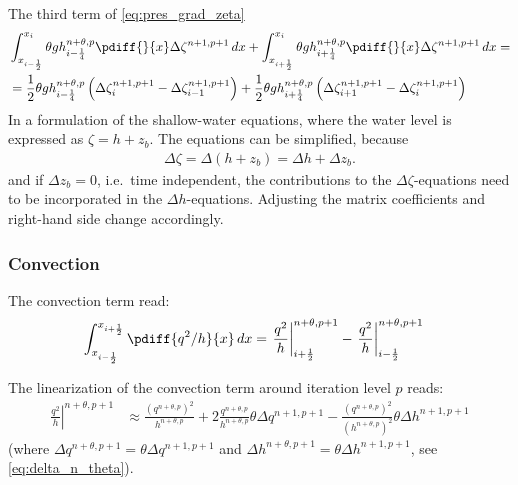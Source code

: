 The third term of \autoref{eq:pres_grad_zeta}
\begin{align}
    &\int_{x_{i-\half}}^{x_{i}} \theta g h^{n+\theta,p}_{i-\quart} \pdiff{}{x} \Delta \zeta^{n+1, p+1} \,dx + \int_{x_{i+\half}}^{x_{i}} \theta g h^{n+\theta,p}_{i+\quart} \pdiff{}{x} \Delta \zeta^{n+1, p+1} \,dx =
    \\
    & = \half \theta g h^{n+\theta,p}_{i-\quart}
    \left(\Delta\zeta^{n+1,p+1}_{i}-\Delta\zeta^{n+1,p+1}_{i-1} \right) +
    \half \theta g h^{n+\theta,p}_{i+\quart}
    \left(\Delta\zeta^{n+1,p+1}_{i+1}-\Delta\zeta^{n+1,p+1}_{i} \right)
\end{align}
In a formulation of the shallow-water equations, where the water level is expressed as $\zeta = h + z_b$.
The equations can be simplified, because
\begin{align}
    \Delta \zeta = \Delta (h + z_b) = \Delta h + \Delta z_b.
\end{align}
and if $\Delta z_b=0$, i.e.\ time independent, the contributions to the $\Delta \zeta$-equations need to be incorporated in the $\Delta h$-equations.
Adjusting the matrix coefficients and right-hand side change accordingly.
\subsubsection{Convection}
The convection term read:
\begin{align}
    &  \int_{x_{i-\half}}^{x_{i+\half}} \pdiff{q^2/h}{x} \,dx
    = \left. \frac{q^2}{h}\right|^{n+\theta, p+1}_{i+\half}
    - \left. \frac{q^2}{h}\right|^{n+\theta, p+1}_{i-\half}
\end{align}

The linearization of the convection term around iteration level $p$ reads:
\begin{align}
    \left. \frac{q^2}{h}\right|^{n+\theta, p+1}
    &\approx
    \frac{(q^{n+\theta,p})^2}{h^{n+\theta,p}} +
    2 \frac{q^{n+\theta,p}}{h^{n+\theta,p}} \theta \Delta q^{n+1,p+1}
    - \frac{(q^{n+\theta,p})^2}{(h^{n+\theta,p})^2}  \theta \Delta h^{n+1,p+1}
\end{align}
(where $\Delta q^{n+\theta,p+1} = \theta \Delta q^{n+1,p+1}$ and $\Delta h^{n+\theta,p+1} = \theta \Delta h^{n+1,p+1}$, see \autoref{eq:delta_n_theta}).
